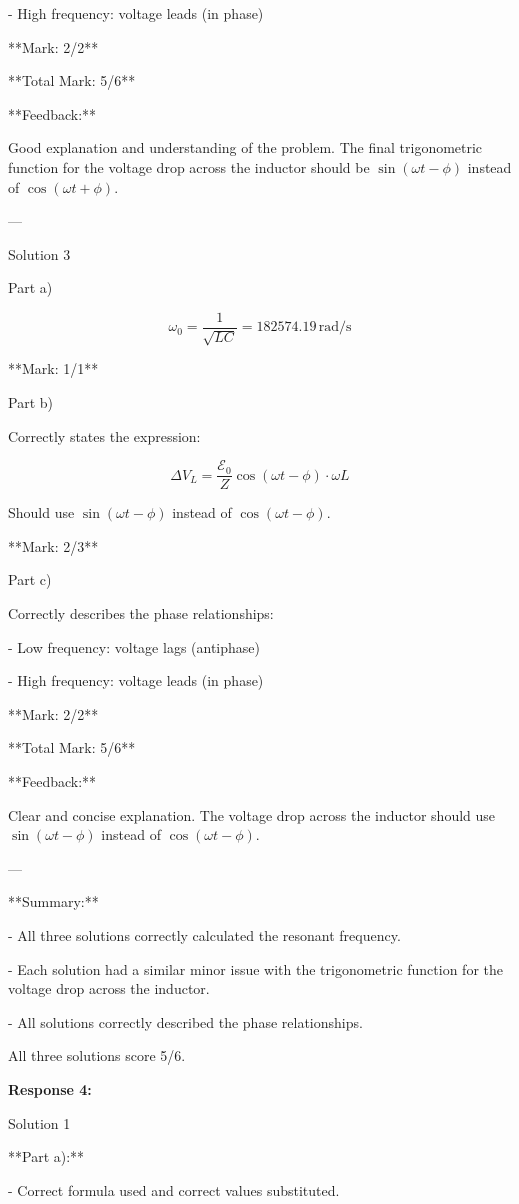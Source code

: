 \documentclass[a4paper,11pt]{article}
\begin{document}
- High frequency: voltage leads (in phase)

**Mark: 2/2**

**Total Mark: 5/6**

**Feedback:**

Good explanation and understanding of the problem. The final trigonometric function for the voltage drop across the inductor should be \(\sin(\omega t - \phi)\) instead of \(\cos(\omega t + \phi)\).

---

Solution 3

Part a)

\[ \omega_0 = \frac{1}{\sqrt{LC}} = 182574.19 \, \text{rad/s} \]

**Mark: 1/1**

Part b)

Correctly states the expression:

\[ \Delta V_L = \frac{\mathcal{E}_0}{Z} \cos(\omega t - \phi) \cdot \omega L \]

Should use \(\sin(\omega t - \phi)\) instead of \(\cos(\omega t - \phi)\).

**Mark: 2/3**

Part c)

Correctly describes the phase relationships:

- Low frequency: voltage lags (antiphase)

- High frequency: voltage leads (in phase)

**Mark: 2/2**

**Total Mark: 5/6**

**Feedback:**

Clear and concise explanation. The voltage drop across the inductor should use \(\sin(\omega t - \phi)\) instead of \(\cos(\omega t - \phi)\).

---

**Summary:**

- All three solutions correctly calculated the resonant frequency.

- Each solution had a similar minor issue with the trigonometric function for the voltage drop across the inductor.

- All solutions correctly described the phase relationships.

All three solutions score 5/6.

\bigskip
\textbf{Response 4:}

Solution 1

**Part a):**

- Correct formula used and correct values substituted.
\end{document}
